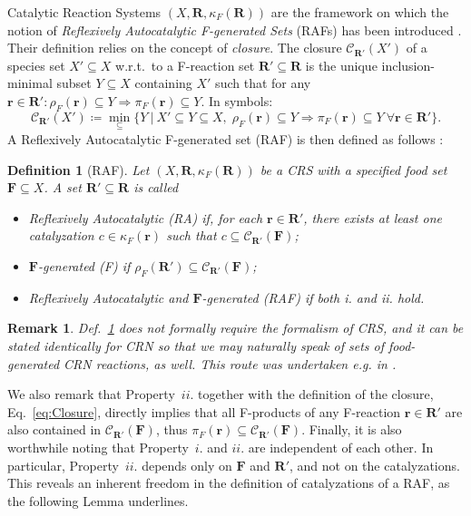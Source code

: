 \documentclass[pdflatex]{sn-jnl}
\theoremstyle{thmstyleone}%
\theoremstyle{examplesty}%
\newtheorem{remark}{Remark}%
\theoremstyle{thmstylethree}%
\newtheorem{definition}[theorem]{Definition}%
\newcommand{\food}{\ensuremath{\mathbf{F}}}
\newcommand{\closure}[2]{\mathscr{C}_{#1}(#2)}
\newcommand{\FR}[0]{\mathbf{R}}
\newcommand{\fr}[0]{\mathbf{r}}
\newcommand{\RAF}[0]{\mathbf{R}'}
\newcommand{\cat}{\kappa_F}
\newcommand{\feducts}{\rho_F}
\newcommand{\fproducts}{\pi_F}
\begin{document}
Catalytic Reaction Systems $(X,\FR,\cat(\FR))$ are the framework on which
the notion of \emph{Reflexively Autocatalytic F-generated Sets} (RAFs) has
been introduced \cite{steel_emergence_2000, hordijk_detecting_2004}. Their
definition relies on the concept of \emph{closure}. The closure
$\closure{\RAF}{X'}$ of a species set $X' \subseteq X$ w.r.t.\ to a
F-reaction set $\RAF \subseteq \FR$ is the unique inclusion-minimal subset
$Y\subseteq X$ containing $X'$ such that for any
$\fr\in \RAF: \feducts(\mathbf{r})\subseteq Y \Rightarrow
\fproducts(\mathbf{r})\subseteq Y$. In symbols:
\begin{equation}\label{eq:Closure}
  \closure{\RAF}{X'} \coloneqq \min_{\subseteq}
  \{Y  \ | \ X'\subseteq Y \subseteq X,\;
  \feducts(\mathbf{r}) \subseteq Y \Rightarrow \fproducts(\mathbf{r})
  \subseteq Y \ \forall
  \mathbf{r}\in \RAF\}.
\end{equation}
A Reflexively Autocatalytic F-generated set (RAF) is then defined as
follows \cite{hordijk_required_2011}:

\vspace{6pt}
\begin{definition}[RAF]\label{def:RAF}
  Let $(X,\FR,\cat(\FR))$ be a CRS with a specified \emph{food set}
  $\food\subseteq X$. A set $\RAF\subseteq \FR$ is called \vspace{6pt}
  \begin{itemize} 
  \item[i.]{\emph{Reflexively Autocatalytic} (RA) if, for each
      $\mathbf{r}\in \RAF$,
      there exists at least one catalyzation $c\in \cat(\mathbf{r})$
      such that $c \subseteq \closure{\RAF}{\food}$;}\\[-1.0em]
  \item[ii.]{\emph{\food-generated} (F) if $\feducts(\RAF)\subseteq
      \closure{\RAF}{\food}$;}\\[-1.0em]
  \item[iii.]{\emph{Reflexively Autocatalytic and $\food$-generated}
      (RAF) if both i. and ii. hold.}
  \end{itemize}
\end{definition}
\begin{remark}\label{rmk:RAFCRN}
  Def.~\ref{def:RAF} does not formally require the formalism of CRS, and it
  can be stated identically for CRN so that we may naturally
  speak of sets of food-generated CRN reactions, as well. This route was
  undertaken e.g. in \cite{golnik_bridging_2026}.
\end{remark}
We also remark that Property~$ii.$ together with the definition of the
closure, Eq.~\eqref{eq:Closure}, directly implies that all F-products of
any F-reaction $\fr\in \RAF$ are also contained in $\closure{\RAF}{\food}$,
thus $\fproducts(\fr)\subseteq \closure{\RAF}{\food}$. Finally, it is also
worthwhile noting that Property~$i.$ and $ii.$ are independent of each
other. In particular, Property~$ii.$ depends only on $\food$ and $\RAF$,
and not on the catalyzations. This reveals an inherent freedom in the
definition of catalyzations of a RAF, as the following Lemma underlines.
\end{document}
